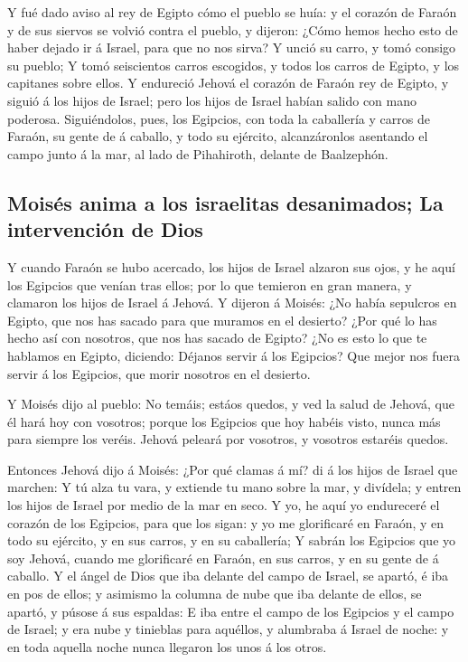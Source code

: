  Y fué dado aviso al rey de Egipto cómo el pueblo se huía: y
el corazón de Faraón y de sus siervos se volvió contra el pueblo, y
dijeron: ¿Cómo hemos hecho esto de haber dejado ir á Israel, para que no
nos sirva?  Y unció su carro, y tomó consigo su pueblo;
 Y tomó seiscientos carros escogidos, y todos los carros de
Egipto, y los capitanes sobre ellos.  Y endureció Jehová el
corazón de Faraón rey de Egipto, y siguió á los hijos de Israel; pero
los hijos de Israel habían salido con mano poderosa. 
Siguiéndolos, pues, los Egipcios, con toda la caballería y carros de
Faraón, su gente de á caballo, y todo su ejército, alcanzáronlos
asentando el campo junto á la mar, al lado de Pihahiroth, delante de
Baalzephón.

\hypertarget{moisuxe9s-anima-a-los-israelitas-desanimados-la-intervenciuxf3n-de-dios}{%
\subsection{Moisés anima a los israelitas desanimados; La intervención
de
Dios}\label{moisuxe9s-anima-a-los-israelitas-desanimados-la-intervenciuxf3n-de-dios}}

 Y cuando Faraón se hubo acercado, los hijos de Israel
alzaron sus ojos, y he aquí los Egipcios que venían tras ellos; por lo
que temieron en gran manera, y clamaron los hijos de Israel á Jehová.
 Y dijeron á Moisés: ¿No había sepulcros en Egipto, que nos
has sacado para que muramos en el desierto? ¿Por qué lo has hecho así
con nosotros, que nos has sacado de Egipto?  ¿No es esto lo
que te hablamos en Egipto, diciendo: Déjanos servir á los Egipcios? Que
mejor nos fuera servir á los Egipcios, que morir nosotros en el
desierto.

 Y Moisés dijo al pueblo: No temáis; estáos quedos, y ved
la salud de Jehová, que él hará hoy con vosotros; porque los Egipcios
que hoy habéis visto, nunca más para siempre los veréis. 
Jehová peleará por vosotros, y vosotros estaréis quedos.

 Entonces Jehová dijo á Moisés: ¿Por qué clamas á mí? di á
los hijos de Israel que marchen:  Y tú alza tu vara, y
extiende tu mano sobre la mar, y divídela; y entren los hijos de Israel
por medio de la mar en seco.  Y yo, he aquí yo endureceré
el corazón de los Egipcios, para que los sigan: y yo me glorificaré en
Faraón, y en todo su ejército, y en sus carros, y en su caballería;
 Y sabrán los Egipcios que yo soy Jehová, cuando me
glorificaré en Faraón, en sus carros, y en su gente de á caballo.
 Y el ángel de Dios que iba delante del campo de Israel, se
apartó, é iba en pos de ellos; y asimismo la columna de nube que iba
delante de ellos, se apartó, y púsose á sus espaldas:  E
iba entre el campo de los Egipcios y el campo de Israel; y era nube y
tinieblas para aquéllos, y alumbraba á Israel de noche: y en toda
aquella noche nunca llegaron los unos á los otros.

